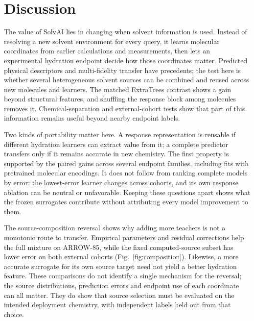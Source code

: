 \documentclass[12pt]{article}
\begin{document}


\FloatBarrier
\section*{Discussion}

The value of SolvAI lies in changing when solvent information is used. Instead
of resolving a new solvent environment for every query, it learns molecular
coordinates from earlier calculations and measurements, then lets an experimental
hydration endpoint decide how those coordinates matter. Predicted physical
descriptors and multi-fidelity transfer have precedents;\cite{mlqmgnn2022,ramakrishnan2015,combisolv2021,twostagehfe2026}
the test here is whether several heterogeneous solvent sources can be combined
and reused across new molecules and learners. The matched ExtraTrees contrast
shows a gain beyond structural features, and shuffling the response block among
molecules removes it. Chemical-separation and external-cohort tests show that
part of this information remains useful beyond nearby endpoint labels.

Two kinds of portability matter here. A response representation is reusable if
different hydration learners can extract value from it; a complete predictor
transfers only if it remains accurate in new chemistry. The first property is
supported by the paired gains across several endpoint families, including fits
with pretrained molecular encodings. It does not follow from ranking complete
models by error: the lowest-error learner changes across cohorts, and its own
response ablation can be neutral or unfavorable. Keeping these questions apart
shows what the frozen surrogates contribute without attributing every model
improvement to them.

The source-composition reversal shows why adding more teachers is not a
monotonic route to transfer. Empirical parameters and residual corrections help
the full mixture on ARROW-85, while the fixed computed-source subset has lower
error on both external cohorts (Fig.~\ref{fig:composition}). Likewise, a more
accurate surrogate for its own source target need not yield a better hydration
feature. These comparisons do not identify a single mechanism for the reversal;
the source distributions, prediction errors and endpoint use of each coordinate
can all matter. They do show that source selection must be evaluated on the
intended deployment chemistry, with independent labels held out from that choice.
\end{document}
